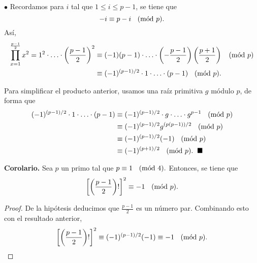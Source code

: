 \documentclass{article}
\newcommand{\Mod}[1]{\ \hspace{0.2cm} (\mathrm{m\acute{o}d}\ #1)}
\begin{document}
$\bullet$ Recordamos para $i$ tal que $1 \leq i \leq p -1$, se tiene que
$$ -i \equiv p - i \Mod{p}. $$
Así, 
\begin{equation*}
\begin{split}
\prod_{x=1}^{\frac{p-1}{2}} x^2 = 1^2 \cdot \ldots \cdot \left(\frac{p-1}{2} \right)^2 &\equiv (-1)(p-1) \cdot \ldots \cdot \left(-\frac{p-1}{2}\right)\left(\frac{p+1}{2}\right) \Mod{p} \\
& \equiv (-1)^{(p-1)/2} \cdot 1 \cdot \ldots \cdot (p-1) \Mod{p}.
\end{split}
\end{equation*}

Para simplificar el producto anterior, usamos una raíz primitiva $g$ módulo $p$, de forma que
\begin{equation*}
\begin{split}
(-1)^{(p-1)/2} \cdot 1 \cdot \ldots \cdot (p-1) &\equiv (-1)^{(p-1)/2} \cdot g \cdot \ldots \cdot g^{p-1} \Mod{p} \\
 &\equiv (-1)^{(p-1)/2} g^{(p(p-1)) / 2} \Mod{p} \\
 & \equiv (-1)^{(p-1)/2} (-1)  \Mod{p} \\
 & \equiv  (-1)^{(p+1)/2} \Mod{p}. \hspace{0.2cm} \blacksquare 
\end{split}
\end{equation*} 

\textbf{Corolario. } Sea $p$ un primo tal que $p \equiv 1 \Mod{4}.$ Entonces, se tiene que
$$ \left[ \left( \frac{p-1}{2} \right)! \right]^2 \equiv -1 \Mod{p}. $$
\begin{proof} De la hipótesis deducimos que $\frac{p-1}{2}$ es un número par. Combinando esto con el resultado anterior,
$$ \left[ \left( \frac{p-1}{2} \right)! \right]^2 \equiv (-1)^{(p-1)/2} (-1) \equiv -1 \Mod{p}. $$
\end{proof}
\end{document}

